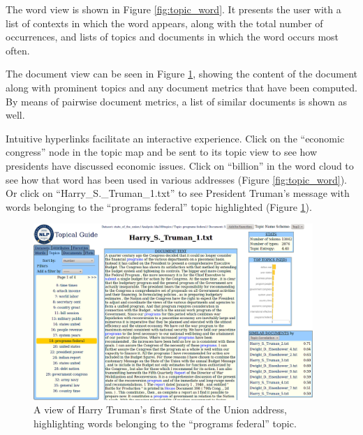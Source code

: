 \documentclass[11pt]{article}
\begin{document}
The word view is shown in Figure \ref{fig:topic_word}. It presents the user with
a list of contexts in which the word appears, along with the total number of
occurrences, and lists of topics and documents in which the word occurs most
often. 

The document view can be seen in Figure \ref{fig:topic_doc}, showing the content
of the document along with prominent topics and any document metrics that have been computed. By
means of pairwise document metrics, a list of similar documents is shown as
well.

Intuitive hyperlinks facilitate an interactive experience. Click on the
``economic congress'' node in the topic map and be sent to its topic view
to see how presidents have discussed economic issues. Click on ``billion'' in
the word cloud to see how that word has been used in various addresses (Figure
\ref{fig:topic_word}). Or click on ``Harry\_S.\_Truman\_1.txt'' to see
President Truman's message with words belonging to the ``programs federal''
topic highlighted (Figure \ref{fig:topic_doc}).


\begin{figure}[t]
 \centering
 \includegraphics[width=400px,keepaspectratio=true]{./topic_document_view.png}
 \caption{A view of Harry Truman's first State of the Union address, highlighting words belonging to the ``programs federal'' topic.}
 \label{fig:topic_doc}
\end{figure}
\end{document}
